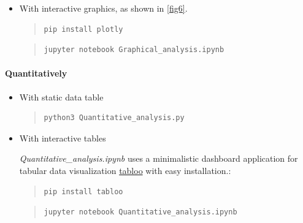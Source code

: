 \documentclass[letterpaper,compsoc,twoside]{IEEEtran}
\begin{document}
\begin{itemize}
\item 
With interactive graphics, as shown in \ref{fig6}.

\begin{quote}
\begin{verbatim}
pip install plotly
\end{verbatim}
\end{quote}

\begin{quote}                                                                                  
\begin{verbatim}
jupyter notebook Graphical_analysis.ipynb
\end{verbatim}
\end{quote}

\end{itemize}

\paragraph{Quantitatively}

\begin{itemize}
\item 
With static data table

\begin{quote}
\begin{verbatim}
python3 Quantitative_analysis.py
\end{verbatim}
\end{quote}
\end{itemize}


\begin{itemize}
\item 
With interactive tables

\textit{Quantitative\_analysis.ipynb} uses a minimalistic dashboard application for tabular data visualization
\href{https://github.com/bluenote10/tabloo}{tabloo} with easy installation.:
\begin{quote}
\begin{verbatim}
pip install tabloo
\end{verbatim}
\end{quote}

\begin{quote}
\begin{verbatim}
jupyter notebook Quantitative_analysis.ipynb
\end{verbatim}
\end{quote}
\end{itemize}
\end{document}
